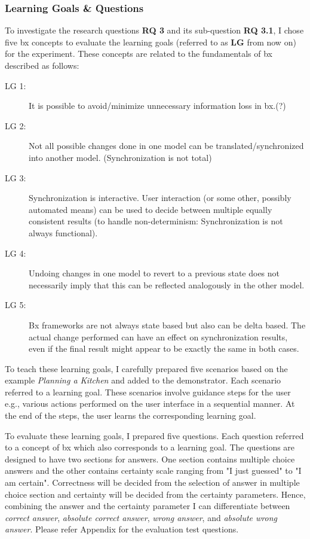 \subsubsection{Learning Goals \& Questions}\label{subsubsec:questions}
To investigate the research questions \textbf{RQ 3} and its sub-question \textbf{RQ 3.1}, I chose five bx concepts to evaluate the learning goals (referred to as \textbf{LG} from now on) for the experiment. These concepts are related to the fundamentals of bx described as follows:
\begin{description}
	\item[LG 1:] It is possible to avoid/minimize unnecessary information loss in bx.(?)
	\item[LG 2:] Not all possible changes done in one model can be translated/synchronized into another model. (Synchronization is not total)
	\item[LG 3:] Synchronization is interactive. User interaction (or some other, possibly automated means) can be used to decide between multiple equally consistent results (to handle non-determinism: Synchronization is not always functional). 
	\item[LG 4:] Undoing changes in one model to revert to a previous state does not necessarily imply that this can be reflected analogously in the other model. 
	\item[LG 5:] Bx frameworks are not always state based but also can be delta based. The actual change performed can have an effect on synchronization results, even if the final result might appear to be exactly the same in both cases. 
\end{description}

To teach these learning goals, I carefully prepared five scenarios based on the example \textit{Planning a Kitchen} and added to the demonstrator. Each scenario referred to a learning goal. These scenarios involve guidance steps for the user e.g., various actions performed on the user interface in a sequential manner. At the end of the steps, the user learns the corresponding learning goal.

To evaluate these learning goals, I prepared five questions. Each question referred to a concept of bx which also corresponds to a learning goal. The questions are designed to have two sections for answers. One section contains multiple choice answers and the other contains certainty scale ranging from "I just guessed" to "I am certain". Correctness will be decided from the selection of answer in multiple choice section and certainty will be decided from the certainty parameters. Hence, combining the answer and the certainty parameter I can differentiate between \emph{correct answer}, \emph{absolute correct answer}, \emph{wrong answer}, and \emph{absolute wrong answer}. Please refer Appendix for the evaluation test questions.

